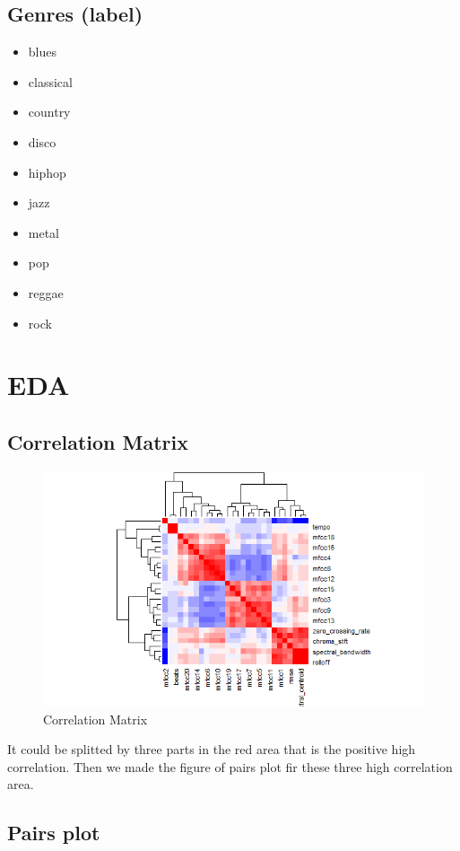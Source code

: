 \documentclass[12pt,a4paper]{article}
\begin{document}
\subsection{Genres (label)}
\begin{itemize}
  \item blues
  \item classical
  \item country
  \item disco
  \item hiphop
  \item jazz
  \item metal
  \item pop
  \item reggae
  \item rock 
\end{itemize}

\newpage
\section{EDA}
\subsection{Correlation Matrix}
\begin{figure}[h]
    \includegraphics[width=1.2\textwidth]{correlation_matrix.png}
    \caption{Correlation Matrix}
\end{figure}

It could be splitted by three parts in the red area that is the positive high correlation. Then we made the figure of pairs plot fir these three high correlation area.
\newpage

\subsection{Pairs plot}
\end{document}
